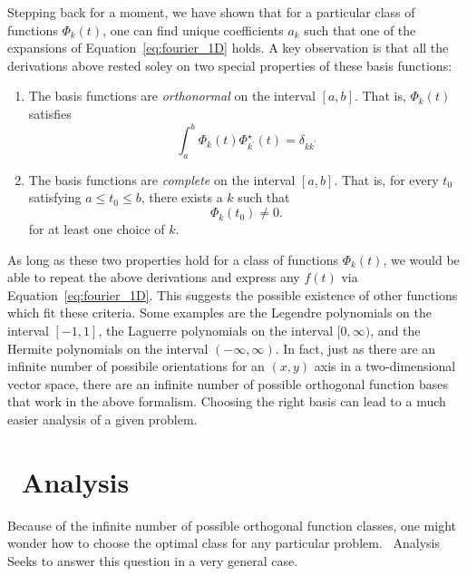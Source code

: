 Stepping back for a moment, we have shown that for a particular
class of functions $\Phi_k(t)$, one can find unique coefficients
$a_k$ such that one of the expansions of Equation~\ref{eq:fourier_1D} holds.
A key observation is that all the derivations above rested 
soley on two special properties of these basis functions:
\begin{enumerate}
  \item
    The basis functions are {\it orthonormal} on the interval $[a, b]$.
    That is, $\Phi_k(t)$ satisfies
    \begin{equation}
      \int_a^b \Phi_k(t) \Phi^\star_{k^\prime}(t) = \delta_{kk^\prime}
    \end{equation}
  \item
    The basis functions are {\it complete} on the interval $[a, b]$.
    That is, for every $t_0$ satisfying $a \le t_0 \le b$, there exists
    a $k$ such that
    \begin{equation}
      \Phi_k(t_0) \ne 0.
    \end{equation}
    for at least one choice of $k$.
\end{enumerate}
As long as these two properties hold for a class of functions $\Phi_k(t)$,
we would be able to repeat the above derivations and express any $f(t)$
via Equation~\ref{eq:fourier_1D}.
This suggests the possible existence of other functions which fit these
criteria.  Some examples are the Legendre polynomials on the interval
$[-1, 1]$, the Laguerre polynomials on the interval $[0, \infty)$, and
the Hermite polynomials on the interval $(-\infty, \infty)$.
In fact, just as there are an infinite number of possibile orientations for
an $(x, y)$ axis in a two-dimensional vector space, there are an infinite
number of possible orthogonal function bases that work in the above
formalism.  Choosing the right basis can lead to a much easier analysis of
a given problem.

\section{\KL\ Analysis}
Because of the infinite number of possible orthogonal function classes,
one might wonder how to choose the optimal class for any particular problem.
\KL\ Analysis Seeks to answer this question in a very general case.

